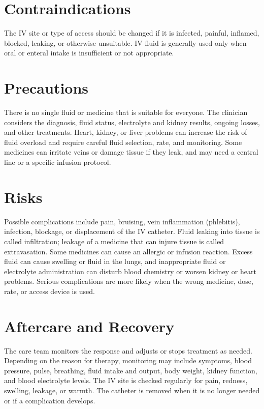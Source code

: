 \section*{Contraindications}
The IV site or type of access should be changed if it is infected, painful, inflamed, blocked, leaking, or otherwise unsuitable. IV fluid is generally used only when oral or enteral intake is insufficient or not appropriate.

\section*{Precautions}
There is no single fluid or medicine that is suitable for everyone. The clinician considers the diagnosis, fluid status, electrolyte and kidney results, ongoing losses, and other treatments. Heart, kidney, or liver problems can increase the risk of fluid overload and require careful fluid selection, rate, and monitoring. Some medicines can irritate veins or damage tissue if they leak, and may need a central line or a specific infusion protocol.

\section*{Risks}
Possible complications include pain, bruising, vein inflammation (phlebitis), infection, blockage, or displacement of the IV catheter. Fluid leaking into tissue is called infiltration; leakage of a medicine that can injure tissue is called extravasation. Some medicines can cause an allergic or infusion reaction. Excess fluid can cause swelling or fluid in the lungs, and inappropriate fluid or electrolyte administration can disturb blood chemistry or worsen kidney or heart problems. Serious complications are more likely when the wrong medicine, dose, rate, or access device is used.

\section*{Aftercare and Recovery}
The care team monitors the response and adjusts or stops treatment as needed. Depending on the reason for therapy, monitoring may include symptoms, blood pressure, pulse, breathing, fluid intake and output, body weight, kidney function, and blood electrolyte levels. The IV site is checked regularly for pain, redness, swelling, leakage, or warmth. The catheter is removed when it is no longer needed or if a complication develops.

